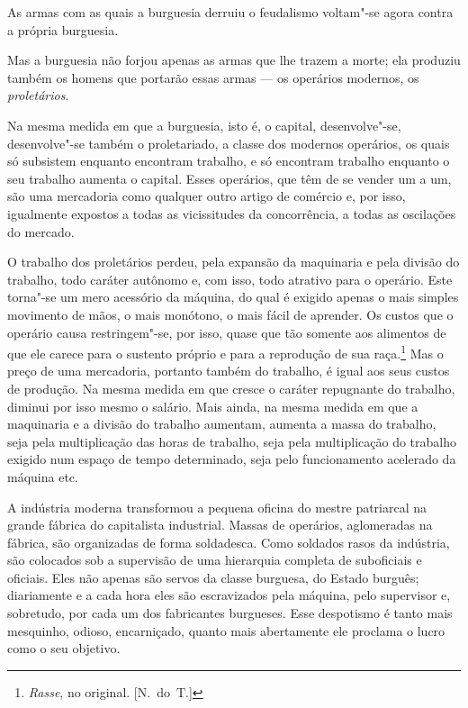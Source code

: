 As armas com as quais a burguesia derruiu o feudalismo voltam"-se agora     \label{4}
contra a própria burguesia.

Mas a burguesia não forjou apenas as armas que lhe trazem a morte; ela
produziu também os homens que portarão essas armas  ---  os operários
modernos, os \textit{proletários}.

Na mesma medida em que a burguesia, isto é, o capital, desenvolve"-se,
desenvolve"-se também o proletariado, a classe dos modernos operários,
os quais só subsistem enquanto encontram trabalho, e só encontram
trabalho enquanto o seu trabalho aumenta o capital. Esses operários,
que têm de se vender um a um, são uma mercadoria como qualquer outro
artigo de comércio e, por isso, igualmente expostos a todas as
vicissitudes da concorrência, a todas as oscilações do mercado.

O trabalho dos proletários perdeu, pela expansão da maquinaria e
pela divisão do trabalho, todo caráter autônomo e, com isso, todo
atrativo para o operário. Este torna"-se um mero acessório da máquina,
do qual é exigido apenas o mais simples movimento de mãos, o mais
monótono, o mais fácil de aprender. Os custos que o operário causa
restringem"-se, por isso, quase que tão somente aos alimentos de que
ele carece para o sustento próprio e para a reprodução de sua
raça.\footnote{ \textit{Rasse}, no original. [N.~do~T.]}
Mas o preço de uma mercadoria, portanto também do trabalho, é
igual aos seus custos de produção. Na mesma medida em que cresce o
caráter repugnante do trabalho, diminui por isso mesmo o salário. Mais
ainda, na mesma medida em que a maquinaria e a divisão do trabalho
aumentam, aumenta a massa do trabalho, seja pela multiplicação das
horas de trabalho, seja pela multiplicação do trabalho exigido num
espaço de tempo determinado, seja pelo funcionamento acelerado da
máquina etc.


A indústria moderna transformou a pequena oficina do mestre patriarcal
na grande fábrica do capitalista industrial. Massas de operários,
aglomeradas na fábrica, são organizadas de forma soldadesca. Como
soldados rasos da indústria, são colocados sob a supervisão de uma
hierarquia completa de suboficiais e oficiais. Eles não apenas são
servos da classe burguesa, do Estado burguês; diariamente e a cada hora
eles são escravizados pela máquina, pelo supervisor e, sobretudo, por
cada um dos fabricantes burgueses. Esse despotismo é tanto mais
mesquinho, odioso, encarniçado, quanto mais abertamente ele proclama o
lucro como o seu objetivo.


